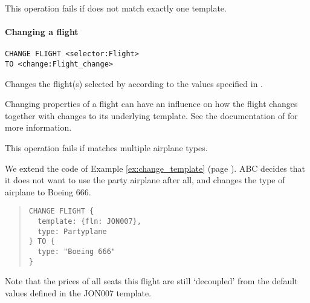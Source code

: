 This operation fails if  does not match exactly one
template.

\paragraph{Changing a flight}
\begin{operation}
  \begin{lstlisting}
CHANGE FLIGHT <selector:Flight>
TO <change:Flight_change>
  \end{lstlisting}
\end{operation}
Changes the flight(s) selected by  according to the values
specified in .

Changing properties of a flight can have an influence on how the flight changes
together with changes to its underlying template. See the documentation of
 for more information.

This operation fails if  matches multiple airplane types.

\begin{texa}
  \label{ex:change_flight}
  We extend the code of Example \ref{ex:change_template} (page
  \pageref{ex:change_template}). ABC decides that it does not want to use the
  party airplane after all, and changes the type of airplane to Boeing 666.
  \begin{quote}\begin{lstlisting}
CHANGE FLIGHT {
  template: {fln: JON007},
  type: Partyplane
} TO {
  type: "Boeing 666"
}
  \end{lstlisting}\end{quote}
  Note that the prices of all seats this flight are still ‘decoupled’ from the
  default values defined in the JON007 template.
\end{texa}

